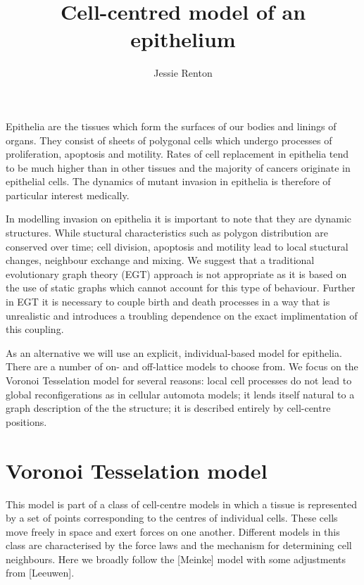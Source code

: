 \documentclass[a4paper]{article}
\title{Cell-centred model of an epithelium}
\author{Jessie Renton}
\begin{document}
 
\maketitle

Epithelia are the tissues which form the surfaces of our bodies and linings of organs. They consist of sheets of polygonal cells which undergo processes of proliferation, apoptosis and motility. Rates of cell replacement in epithelia tend to be much higher than in other tissues and the majority of cancers originate in epithelial cells. The dynamics of mutant invasion in epithelia is therefore of particular interest medically.

In modelling invasion on epithelia it is important to note that they are dynamic structures. While stuctural characteristics such as polygon distribution are conserved over time; cell division, apoptosis and motility lead to local stuctural changes, neighbour exchange and mixing. We suggest that a traditional evolutionary graph theory (EGT) approach is not appropriate as it is based on the use of static graphs which cannot account for this type of behaviour. Further in EGT it is necessary to couple birth and death processes in a way that is unrealistic and introduces a troubling dependence on the exact implimentation of this coupling. 

As an alternative we will use an explicit, individual-based model for epithelia. There are a number of on- and off-lattice models to choose from. We focus on the Voronoi Tesselation model for several reasons: local cell processes do not lead to global reconfigerations as in cellular automota models; it lends itself natural to a graph description of the the structure; it is described entirely by cell-centre positions.

\section{Voronoi Tesselation model}

This model is part of a class of cell-centre models in which a tissue is represented by a set of points corresponding to the centres of individual cells. These cells move freely in space and exert forces on one another. Different models in this class are characterised by the force laws and the mechanism for determining cell neighbours. Here we broadly follow the [Meinke] model with some adjustments from [Leeuwen].
\end{document}
